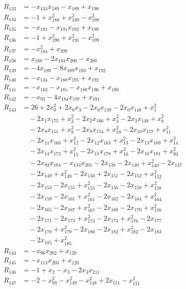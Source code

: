 \begin{align*}
R_{133}&=-x_{134}x_{189}-x_{189}+x_{198}\\
R_{134}&=-1+x_{188}^{2}+x_{189}^{2}-x_{198}^{2}\\
R_{135}&=-x_{191}-x_{191}x_{192}+x_{199}\\
R_{136}&=-1+x_{190}^{2}+x_{191}^{2}-x_{199}^{2}\\
R_{137}&=-x_{184}^{2}+x_{200}\\
R_{138}&=x_{189}-2x_{194}x_{200}-x_{200}\\
R_{139}&=-4x_{189}-8x_{189}x_{193}+x_{192}\\
R_{140}&=-x_{134}-x_{188}x_{195}+x_{192}\\
R_{141}&=-x_{183}-x_{185}-x_{188}x_{196}+x_{190}\\
R_{142}&=-x_{93}-4x_{184}x_{197}+x_{191}\\
R_{143}&=26+2x_{0}^{2}+2x_{0}x_{3}-2x_{0}x_{139}-2x_{0}x_{148}+x_{1}^{2}\\
&\quad{}-2x_{1}x_{175}+x_{2}^{2}-2x_{2}x_{166}+x_{3}^{2}-2x_{3}x_{148}+x_{8}^{2}\\
&\quad{}-2x_{8}x_{151}+x_{9}^{2}-2x_{9}x_{154}+x_{10}^{2}-2x_{10}x_{157}+x_{11}^{2}\\
&\quad{}-2x_{11}x_{160}+x_{12}^{2}-2x_{12}x_{163}+x_{13}^{2}-2x_{13}x_{169}+x_{14}^{2}\\
&\quad{}-2x_{14}x_{172}+x_{15}^{2}-2x_{15}x_{178}+x_{16}^{2}-2x_{16}x_{181}+x_{93}^{2}\\
&\quad{}-2x_{93}x_{184}-x_{134}x_{201}-2x_{138}-2x_{140}+x_{140}^{2}-2x_{147}\\
&\quad{}-2x_{149}+x_{149}^{2}-2x_{150}+2x_{151}-2x_{152}+x_{152}^{2}\\
&\quad{}-2x_{153}-2x_{155}+x_{155}^{2}-2x_{156}-2x_{158}+x_{158}^{2}\\
&\quad{}-2x_{159}-2x_{161}+x_{161}^{2}-2x_{162}-2x_{164}+x_{164}^{2}\\
&\quad{}-2x_{165}-2x_{167}+x_{167}^{2}-2x_{168}-2x_{170}+x_{170}^{2}\\
&\quad{}-2x_{171}-2x_{173}+x_{173}^{2}-2x_{174}+x_{176}^{2}-2x_{177}\\
&\quad{}-2x_{179}+x_{179}^{2}-2x_{180}-2x_{182}+x_{182}^{2}-2x_{183}\\
&\quad{}-2x_{185}+x_{185}^{2}\\
R_{144}&=-x_{96}x_{202}+x_{120}\\
R_{145}&=-x_{113}x_{203}+x_{120}\\
R_{146}&=-1+x_{2}-x_{3}-2x_{3}x_{211}\\
R_{147}&=-2-x_{93}^{2}-x_{139}^{2}-x_{148}^{2}+2x_{151}-x_{151}^{2}\\

\end{align*}
